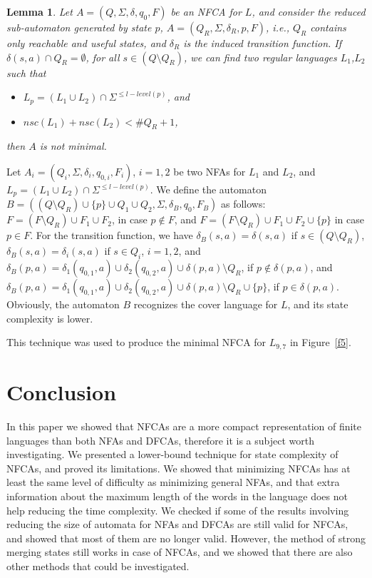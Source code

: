 \documentclass[submission,copyright,creativecommons]{eptcs}
\newtheorem{lemma}{Lemma}
\newenvironment{proof}[1][Proof]{\begin{trivlist}
\item[\hskip \labelsep {\bfseries #1}]}{\end{trivlist}}
\begin{document}
\begin{lemma}
Let $A=(Q,\Sigma,\delta,q_0,F)$ be an NFCA for $L$, and consider the reduced sub-automaton
generated by state $p$, $A=(Q_R,\Sigma,\delta_R,p,F)$, i.e.,  $Q_R$ 
contains only reachable and useful states, and $\delta_R$ is the induced transition function.
If $\delta(s,a)\cap Q_R=\emptyset$, for all $s\in (Q\setminus Q_R)$, we can find two regular languages $L_1$,$L_2$ such that
\begin{itemize}
 \item $L_p=(L_1\cup L_2)\cap \Sigma^{\leq l-level(p)}$, and
 \item $nsc(L_1)+nsc(L_2)<\#Q_R+1$,
\end{itemize}
then $A$ is not minimal.
\end{lemma}
\begin{proof}
Let $A_i=(Q_i,\Sigma,\delta_i,q_{0,i},F_i)$, $i=1,2 $ be two NFAs
for $L_1$ and $L_2$, and  $L_p=(L_1\cup L_2)\cap \Sigma^{\leq l-level(p)}$.
We define the automaton $B=((Q\setminus Q_R)\cup \{p\}\cup Q_1\cup Q_2, \Sigma, \delta_B,q_0,F_B)$ as follows:
$F=(F\setminus Q_R)\cup F_1\cup F_2$, in case $p\notin F$, 
and $F=(F\setminus Q_R)\cup F_1\cup F_2\cup\{p\}$ in case $p\in F$.
For the transition function, we have $\delta_B(s,a)=\delta(s,a)$ if $s\in (Q\setminus Q_R)$,
$\delta_B(s,a)=\delta_i(s,a)$ if $s\in Q_i$, $i=1,2$,
and
$\delta_B(p,a)=\delta_1(q_{0,1},a)\cup\delta_2(q_{0,2},a)\cup\delta(p,a)\setminus Q_R$, if $p\notin\delta(p,a)$,
and $\delta_B(p,a)=\delta_1(q_{0,1},a)\cup\delta_2(q_{0,2},a)\cup\delta(p,a)\setminus Q_R\cup\{p\}$, if $p\in\delta(p,a)$.
Obviously, the automaton $B$ recognizes the cover language for $L$, 
and its state complexity is lower.
\end{proof}
This technique was used to produce the minimal NFCA for $L_{9,7}$ in Figure~\ref{f5}.

\section{Conclusion}
\label{openproblems}
In this paper we showed that NFCAs are a more compact representation of finite languages than both 
NFAs and DFCAs, therefore it is a subject worth investigating.
We presented a lower-bound technique for state complexity of NFCAs, and proved its limitations.
We showed that minimizing NFCAs has at least the same level of difficulty as minimizing 
general NFAs, and that extra information about the maximum length of the words in the language 
does not help reducing the time complexity.
We checked if some of the results involving reducing the size of automata for NFAs and DFCAs
are still valid for NFCAs, and showed that most of them are no longer valid. 
However, the method of strong merging states still works in case of NFCAs, and we showed 
that there are also other methods that could be investigated.
\end{document}
